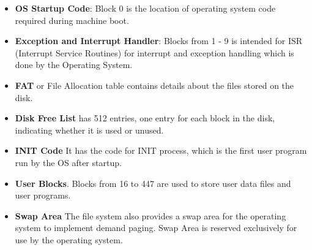 \documentclass[11pt]{article}
\begin{document}
\begin{itemize}
\item \textbf{OS Startup Code}: Block 0 is the location of operating system code required during machine boot. 
\item \textbf{Exception and Interrupt Handler}: Blocks from 1 - 9 is intended for ISR (Interrupt Service Routines) for interrupt and exception handling which is done by the Operating System.  
\item \textbf{FAT} or File Allocation table contains details about the files stored on the disk. 
\item \textbf{Disk Free List} has 512 entries, one entry for each block in the disk, indicating whether it is used or unused. 
\item \textbf{INIT Code} It has the code for INIT process, which is the first user program run by the OS after startup. 
\item \textbf{User Blocks}. Blocks from 16 to 447 are used to store user data files and user programs. 
\item \textbf{Swap Area} The file system also provides a swap area for the operating system to implement demand paging. Swap Area is reserved exclusively for use by the operating system.

\end{itemize}
\end{document}
